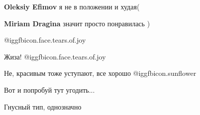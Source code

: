 \begin{itemize}
\begin{itemize} %
\textbf{Oleksiy Efimov} я не в положении и худая(

\textbf{Miriam Dragina} значит просто понравилась )
\end{itemize} %

 @igg{fbicon.face.tears.of.joy} 

Жиза!  @igg{fbicon.face.tears.of.joy} 

Не, красивым тоже уступают, все хорошо  @igg{fbicon.sunflower} 

Вот и попробуй тут угодить...


Гнусный тип, однозначно


\end{itemize} %
